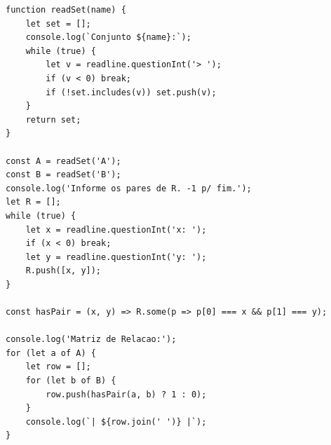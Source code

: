 \documentclass[12pt]{article}
\begin{document}
\begin{enumerate}
\begin{lstlisting}
function readSet(name) {
    let set = [];
    console.log(`Conjunto ${name}:`);
    while (true) {
        let v = readline.questionInt('> ');
        if (v < 0) break;
        if (!set.includes(v)) set.push(v);
    }
    return set;
}

const A = readSet('A');
const B = readSet('B');
console.log('Informe os pares de R. -1 p/ fim.');
let R = [];
while (true) {
    let x = readline.questionInt('x: ');
    if (x < 0) break;
    let y = readline.questionInt('y: ');
    R.push([x, y]);
}

const hasPair = (x, y) => R.some(p => p[0] === x && p[1] === y);

console.log('Matriz de Relacao:');
for (let a of A) {
    let row = [];
    for (let b of B) {
        row.push(hasPair(a, b) ? 1 : 0);
    }
    console.log(`| ${row.join(' ')} |`);
}
\end{lstlisting}

\end{enumerate}
\end{document}
